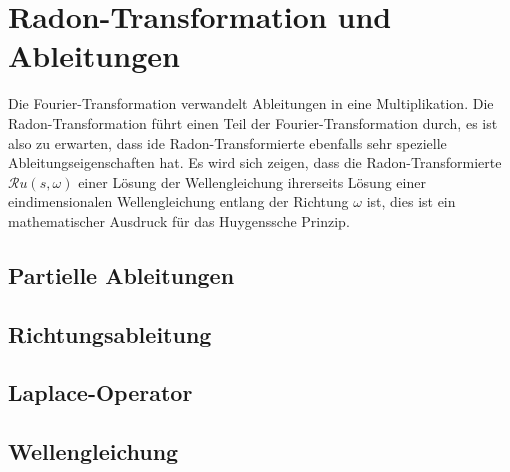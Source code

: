 %
%
%
\section{Radon-Transformation und Ableitungen
\label{buch:radon:section:ableitungen}}
Die Fourier-Transformation verwandelt Ableitungen in eine Multiplikation.
Die Radon-Transformation führt einen Teil der Fourier-Transformation
durch, es ist also zu erwarten, dass ide Radon-Transformierte ebenfalls
sehr spezielle Ableitungseigenschaften hat.
Es wird sich zeigen, dass die Radon-Transformierte $\mathscr{R}u(s,\omega)$
einer Lösung der Wellengleichung ihrerseits Lösung einer
eindimensionalen Wellengleichung entlang der Richtung $\omega$ ist,
dies ist ein mathematischer Ausdruck für das Huygenssche Prinzip.

%
%
\subsection{Partielle Ableitungen
\label{buch:radon:ableitungen:subsection:partiell}}

%
%
\subsection{Richtungsableitung
\label{buch:radon:ableitungen:subsection:richtungsableitung}}

%
%
\subsection{Laplace-Operator
\label{buch:radon:ableitungen:subsection:laplace}}

%
%
\subsection{Wellengleichung
\label{buch:radon:ableitungen:subsection:wellengleichung}}



